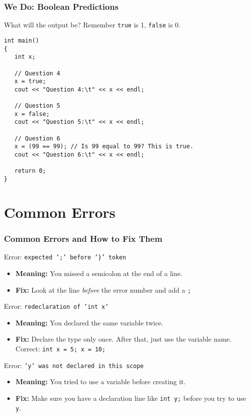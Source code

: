 \documentclass{beamer}
\begin{document}
\begin{frame}[fragile]
\frametitle{We Do: Boolean Predictions}
What will the output be? Remember \texttt{true} is 1, \texttt{false} is 0.
\begin{verbatim}
int main()
{
   int x;

   // Question 4
   x = true;
   cout << "Question 4:\t" << x << endl;

   // Question 5
   x = false;
   cout << "Question 5:\t" << x << endl;

   // Question 6
   x = (99 == 99); // Is 99 equal to 99? This is true.
   cout << "Question 6:\t" << x << endl;

   return 0;
}
\end{verbatim}
\end{frame}

\section{Common Errors}

\begin{frame}
\frametitle{Common Errors and How to Fix Them}
\begin{alertblock}{Error: \texttt{expected ';' before '\}' token}}
\begin{itemize}
    \item \textbf{Meaning:} You missed a semicolon at the end of a line.
    \item \textbf{Fix:} Look at the line \textit{before} the error number and add a \texttt{;}
\end{itemize}
\end{alertblock}

\begin{alertblock}{Error: \texttt{redeclaration of 'int x'}}
\begin{itemize}
    \item \textbf{Meaning:} You declared the same variable twice.
    \item \textbf{Fix:} Declare the type only once. After that, just use the variable name.\\
    Correct: \texttt{int x = 5; x = 10;}
\end{itemize}
\end{alertblock}

\begin{alertblock}{Error: \texttt{'y' was not declared in this scope}}
\begin{itemize}
    \item \textbf{Meaning:} You tried to use a variable before creating it.
    \item \textbf{Fix:} Make sure you have a declaration line like \texttt{int y;} before you try to use \texttt{y}.
\end{itemize}
\end{alertblock}
\end{frame}
\end{document}
